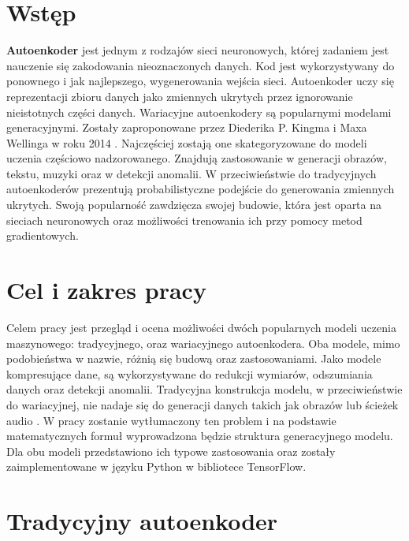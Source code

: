 \documentclass[a4paper,12pt,oneside]{book} %
\begin{document}
\sloppy

\thispagestyle{empty}



\tableofcontents{}

\chapter*{Wstęp} %
\textbf{Autoenkoder} jest jednym z rodzajów sieci neuronowych, której zadaniem jest nauczenie się zakodowania nieoznaczonych danych. Kod jest wykorzystywany do ponownego i jak najlepszego, wygenerowania wejścia sieci. Autoenkoder uczy się reprezentacji zbioru danych jako zmiennych ukrytych przez ignorowanie nieistotnych części danych.
Wariacyjne autoenkodery są popularnymi modelami generacyjnymi. Zostały zaproponowane przez Diederika P. Kingma i Maxa Wellinga w roku 2014 \cite{kingma2014autoencoding}. Najczęściej zostają one skategoryzowane do modeli uczenia częściowo nadzorowanego. Znajdują zastosowanie w generacji obrazów, tekstu, muzyki oraz w detekcji anomalii. W przeciwieństwie do tradycyjnych autoenkoderów prezentują probabilistyczne podejście do generowania zmiennych ukrytych. Swoją popularność zawdzięcza swojej budowie, która jest oparta na sieciach neuronowych oraz możliwości trenowania ich przy pomocy metod gradientowych.
\chapter*{Cel i zakres pracy}
Celem pracy jest przegląd i ocena możliwości dwóch popularnych modeli uczenia maszynowego: tradycyjnego, oraz wariacyjnego autoenkodera. Oba modele, mimo podobieństwa w nazwie, różnią się budową oraz zastosowaniami. Jako modele kompresujące dane, są wykorzystywane do redukcji wymiarów, odszumiania danych oraz detekcji anomalii. Tradycyjna konstrukcja modelu, w przeciwieństwie do wariacyjnej, nie nadaje się do generacji danych takich jak obrazów lub ścieżek audio \cite{vaeaudio}. W pracy zostanie wytłumaczony ten problem i na podstawie matematycznych formuł wyprowadzona będzie struktura generacyjnego modelu. Dla obu modeli przedstawiono ich typowe zastosowania oraz zostały zaimplementowane w języku Python w bibliotece TensorFlow.
\chapter{Tradycyjny autoenkoder}
\end{document}
